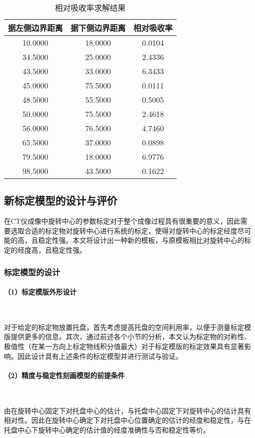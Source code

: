 \documentclass[withoutpreface,bwprint]{cumcmthesis} %
\begin{document}
\begin{table}[!h]
\centering
\caption{相对吸收率求解结果}
\label{q3相对吸收率求解结果}
\begin{tabular}{ccc}
\toprule
据左侧边界距离&据下侧边界距离&相对吸收率\\
\midrule
10.0000 &	18.0000 &0.0104\\
34.5000 &	25.0000 &2.4336\\
43.5000 &	33.0000 &6.3433\\
45.0000 &	75.5000 &0.0111\\
48.5000 &	55.5000 &0.5005\\
50.0000 &	75.5000 &2.4618\\
56.0000 &	76.5000 &4.7460\\
65.5000 &	37.0000 &0.0898\\
79.5000 &	18.0000 &6.9776\\
98.5000 &	43.5000 &0.1622\\
\bottomrule 
\end{tabular}
\end{table}



\subsection{新标定模型的设计与评价}
\par 在CT仪成像中旋转中心的参数标定对于整个成像过程具有很重要的意义，因此需要选取合适的标定物对旋转中心进行系统的标定，使得对旋转中心的标定经度尽可能的高，且稳定性强。本文将设计出一种新的模板，与原模板相比对旋转中心的标定的经度高，且稳定性强。
\subsubsection{标定模型的设计}
\paragraph*{（1）标定模版外形设计}~\\
\par 对于给定的标定物放置托盘，首先考虑提高托盘的空间利用率，以便于测量标定模版提供更多的信息。其次，通过前述各个小节的分析，本文认为标定物的对称性、极值性（在某一方向上标定物线积分值最大）对于标定模版的标定效果具有显著影响。因此设计具有上述条件的标定模型并进行测试与验证。
\paragraph*{（2）精度与稳定性刻画模型的前提条件}~\\
\par 由在旋转中心固定下对托盘中心的估计，与托盘中心固定下对旋转中心的估计具有相对性。因此在旋转中心确定下对托盘中心位置确定的估计的经度和稳定性，与在托盘中心下旋转中心确定的估计值的经度准确性与否和稳定性等价。
\end{document}
